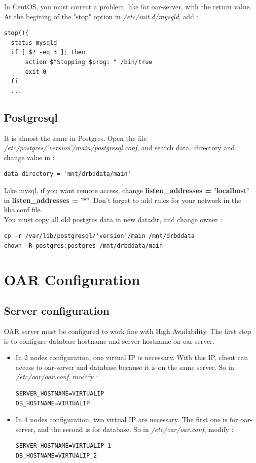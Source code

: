 \documentclass[a4paper,10pt]{report}
\begin{document}
In CentOS, you must correct a problem, like for oar-server, with the return value. At the begining of the "stop" option in \textit{/etc/init.d/mysqld}, add :
\begin{lstlisting}
stop(){
  status mysqld
  if [ $? -eq 3 ]; then
      action $"Stopping $prog: " /bin/true
      exit 0
  fi
  ...
\end{lstlisting}

\subsection{Postgresql}
It is almost the same in Postgres. Open the file \textit{/etc/postgres/'version'/main/postgresql.conf}, and search data\_directory and change value in :
\begin{lstlisting}
data_directory = 'mnt/drbddata/main'
\end{lstlisting}
Like mysql, if you want remote access, change \textbf{listen\_addresses = 'localhost'} in \textbf{listen\_addresses = '*'}. Don't forget to add rules for your network in the hba.conf file.\\
You must copy all old postgres data in new datadir, and change owner :
\begin{lstlisting}
cp -r /var/lib/postgresql/'version'/main /mnt/drbddata
chown -R postgres:postgres /mnt/drbddata/main
\end{lstlisting}



\section{OAR Configuration}
\subsection{Server configuration}
OAR server must be configured to work fine with High Availability. The first step is to configure database hostname and server hostname on oar-server.
\begin{itemize}
 \item In 2 nodes configuration, one virtual IP is necessary. With this IP, client can access to oar-server and database because it is on the same server.
So in \textit{/etc/oar/oar.conf}, modify :
\begin{lstlisting}
SERVER_HOSTNAME=VIRTUALIP
DB_HOSTNAME=VIRTUALIP
\end{lstlisting}
\item In 4 nodes configuration, two virtual IP are necessary. The first one is for oar-server, and the second is for database.
So in \textit{/etc/oar/oar.conf}, modify :
\begin{lstlisting}
SERVER_HOSTNAME=VIRTUALIP_1
DB_HOSTNAME=VIRTUALIP_2
\end{lstlisting}

\end{itemize}
\end{document}
